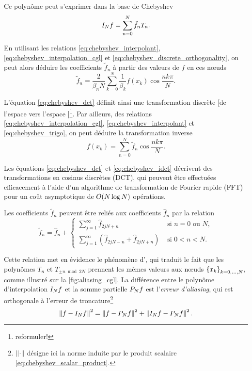 Ce polynôme peut s'exprimer dans la base de Chebyshev
\begin{equation}
	\interpolant{f}{N} = \sum_{n=0}^{N} \tilde{f}_n T_n.
	\label{eq:chebyshev_interpolant}
\end{equation}

En utilisant les relations \eqref{eq:chebyshev_interpolant}, \eqref{eq:chebyshev_interpolation_cgl} et \eqref{eq:chebyshev_discrete_orthogonality}, on peut alors déduire les coefficients $\tilde{f}_n$ à partir des valeurs de $f$ en ces n\oe uds
\begin{equation}
	\tilde{f}_n = \frac{2}{\beta_n N} \sum_{k=0}^{N} \frac{1}{\beta_k} f(x_k) \cos \frac{n k \pi}{N}.
	\label{eq:chebyshev_dct}
\end{equation}

L'équation \eqref{eq:chebyshev_dct} définit ainsi une transformation discrète [de l'espace  vers l'espace ]\footnote{reformuler!}. 
Par ailleurs, des relations \eqref{eq:chebyshev_interpolation_cgl}, \eqref{eq:chebyshev_interpolant} et \eqref{eq:chebyshev_trigo}, on peut déduire la transformation inverse
\begin{equation}
	f(x_k) = \sum_{n=0}^{N} \tilde{f}_n \cos \frac{n k \pi}{N}.
	\label{eq:chebyshev_idct}
\end{equation}

Les équations \eqref{eq:chebyshev_dct} et \eqref{eq:chebyshev_idct} décrivent des transformations en cosinus discrètes (DCT), qui peuvent être effectuées efficacement à l'aide d'un algorithme de transformation de Fourier rapide (FFT) pour un coût asymptotique de $\bigO{N \log N}$ opérations.
\par
Les coefficients $\tilde{f}_n$ peuvent être reliés aux coefficients $\hat{f}_n$ par la relation
\begin{equation}
	\tilde{f}_n = \hat{f}_n + 
	\begin{cases}
		\displaystyle\sum_{j=1}^{\infty} \hat{f}_{2jN + n} & \text{\ si\ } n = 0 \text{\ ou\ } N,   \\[4ex]
		\displaystyle\sum_{j=1}^{\infty} \left( \hat{f}_{2jN - n} + \hat{f}_{2jN + n} \right) & \text{\ si\ } 0 < n < N. 
	\end{cases}
	\label{eq:chebyshev_aliasing}
\end{equation}

Cette relation met en évidence le phénomène d', qui traduit le fait que les polynômes $T_n$ et $T_{\pm n \bmod{2N}}$ prennent les mêmes valeurs aux n\oe uds $\family{x}{k}{0}{N}$, comme illustré sur la \autoref{fig:aliasing_cgl}.
La différence entre le polynôme d'interpolation $\interpolant{f}{N}$ et la somme partielle $\truncseries{f}{N}$ est l'\textit{erreur d'aliasing}, qui est orthogonale à l'erreur de troncature\footnote{$\normtwo{\cdot}$ désigne ici la norme induite par le produit scalaire \eqref{eq:chebyshev_scalar_product}.}
\begin{equation}
	\normtwo{f - \interpolant{f}{N}}^2 = 
	\normtwo{f - \truncseries{f}{N}}^2 + 
	\normtwo{\interpolant{f}{N} - \truncseries{f}{N}}^2.
	\label{eq:chebyshev_aliasing_esrror}
\end{equation}

